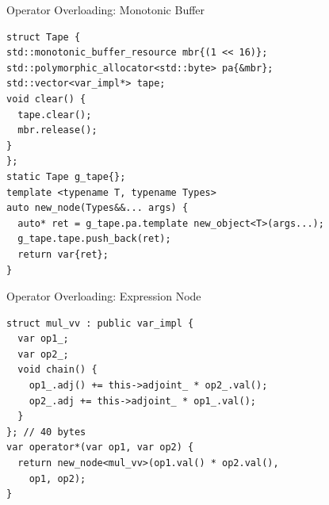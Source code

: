 \documentclass[dvipsnames]{beamer}
\newenvironment{CacheLine}[1][]{
  \begin{tikzpicture}[x=1.2cm,y=0.8cm,font=\footnotesize,>=Stealth,#1]
    \def\CacheH{1.0}   %
    \def\CacheBelow{1.0} %

}{
    \foreach \i in {1,...,7} { \draw[black!40] (\i,0) -- (\i,\CacheH); }
    \draw[line width=0.6pt, rounded corners=2pt] (0,0) rectangle (8,\CacheH);
    \foreach \i in {0,...,7} {
      \node[below=3pt, text=black!75] at (\i+0.5,0) {8B \i};
    }
  \end{tikzpicture}
}
\newcommand{\CacheColor}[2]{%
  \fill[#2, fill opacity=0.35, draw=none] (#1,0) rectangle ++(1,\CacheH);%
}
\newcommand{\CacheMarkBelow}[3][green!60!black]{%
  \draw[-{Stealth[length=3mm]}, very thick, draw=#1] (#2,-\CacheBelow+0.28) -- (#2,0.02);
  \node[below, anchor=west, text=#1] at (#2,-\CacheBelow-0.2) {#3};
}
\newcommand{\CacheSetBelow}[1]{\def\CacheBelow{#1}}
\begin{document}
\begin{frame}[fragile]{Operator Overloading: Monotonic Buffer}
\begin{verbatim}
struct Tape {
std::monotonic_buffer_resource mbr{(1 << 16)};
std::polymorphic_allocator<std::byte> pa{&mbr};
std::vector<var_impl*> tape;
void clear() {
  tape.clear();
  mbr.release();
}
};
static Tape g_tape{};
template <typename T, typename Types>
auto new_node(Types&&... args) {
  auto* ret = g_tape.pa.template new_object<T>(args...);
  g_tape.tape.push_back(ret);
  return var{ret};
}
\end{verbatim}
\end{frame}

\begin{frame}[fragile]{Operator Overloading: Expression Node}
\begin{verbatim}
struct mul_vv : public var_impl {
  var op1_;
  var op2_;
  void chain() {
    op1_.adj() += this->adjoint_ * op2_.val();
    op2_.adj += this->adjoint_ * op1_.val();
  }
}; // 40 bytes
var operator*(var op1, var op2) {
  return new_node<mul_vv>(op1.val() * op2.val(),
    op1, op2);
}
\end{verbatim}

\end{frame}
\end{document}
